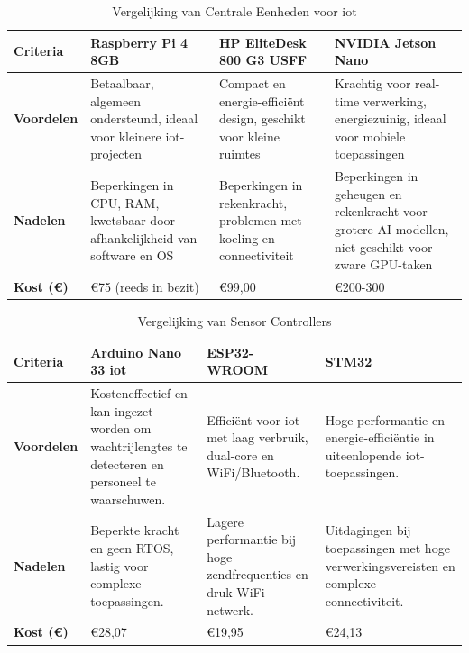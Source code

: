 \begin{table}[h!]
    \small
    \caption{Vergelijking van Centrale Eenheden voor \gls{iot} \autocite{Calvo2016, Hosny2023, SainzRaso2019, 王丁2014, Pham2024}}
    \label{tab:vergelijking-centrale-eenheid}
    \begin{tabular}{|p{2cm}|p{3.8cm}|p{4cm}|p{4cm}|}
        \hline
        \textbf{Criteria} & \textbf{Raspberry Pi 4 8GB} & \textbf{HP EliteDesk 800 G3 USFF} & \textbf{NVIDIA Jetson Nano} \\
        \hline
        \textbf{Voordelen} & Betaalbaar, algemeen ondersteund, ideaal voor kleinere \gls{iot}-projecten & Compact en energie-efficiënt design, geschikt voor kleine ruimtes & Krachtig voor real-time verwerking, energiezuinig, ideaal voor mobiele toepassingen \\
        \hline
        \textbf{Nadelen} & Beperkingen in CPU, RAM, kwetsbaar door afhankelijkheid van software en OS & Beperkingen in rekenkracht, problemen met koeling en connectiviteit & Beperkingen in geheugen en rekenkracht voor grotere AI-modellen, niet geschikt voor zware GPU-taken  \\
        \hline
        \textbf{Kost (€)} & €75 (reeds in bezit) & €99,00 & €200-300 \\
        \hline
    \end{tabular}
\end{table}
\clearpage


\begin{table}[h!]
    \small
    \caption{Vergelijking van Sensor Controllers \autocite{Hussain2024, Viriyavisuthisakul2017, Spohn2020, Maier2017, Wang2020, Wu2020, Kovacshazy2024}}
    \label{tab:vergelijking-sensorcontroller}
    \begin{tabular}{|p{2cm}|p{4cm}|p{4cm}|p{4cm}|}
        \hline
        \textbf{Criteria} & \textbf{Arduino Nano 33 \gls{iot}} & \textbf{ESP32-WROOM} & \textbf{STM32} \\
        \hline
        \textbf{Voordelen} 
        & Kosteneffectief en kan ingezet worden om wachtrijlengtes te detecteren en personeel te waarschuwen. 
        & Efficiënt voor \gls{iot} met laag verbruik, dual-core en WiFi/Bluetooth. 
        & Hoge performantie en energie-efficiëntie in uiteenlopende \gls{iot}-toepassingen. \\
        \hline
        \textbf{Nadelen} 
        & Beperkte kracht en geen RTOS, lastig voor complexe toepassingen. 
        & Lagere performantie bij hoge zendfrequenties en druk WiFi-netwerk. 
        & Uitdagingen bij toepassingen met hoge verwerkingsvereisten en complexe connectiviteit. \\
        \hline
        \textbf{Kost (€)} 
        & €28,07 
        & €19,95 
        & €24,13 \\
        \hline
    \end{tabular}
\end{table}

